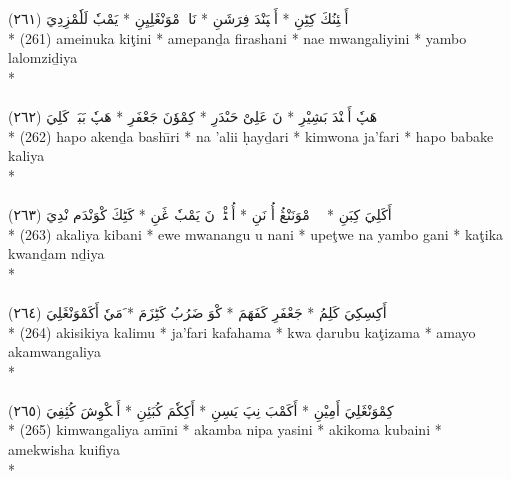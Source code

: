 \documentclass[a4paper, 12pt]{report}
\begin{document}
\begin{center}
\textarabic{(٢٦١) \textcolor{mygreen}{أَمٖئِنُكَ كِٹِنِ  * أَمٖپَنْدَ فِرَشَنِ  * نَاءٖ مْوَنْڠَلِيِنِ  * يَمْبٗ لَلٗمْزِدِيَ }} \\* 
(261) ameinuka kiţini  * amepanḏa firashani  * nae mwangaliyini  * yambo lalomziḏiya  \\* 
 \\ 
\\[8mm] 

\textarabic{(٢٦٢) \textcolor{mygreen}{هَپٗ أَكٖنْدَ بَشِيْرِ  * نَ عَلِىْ حَىْدَرِ  * كِمْوٗنَ جَعْفَرِ  * هَپٗ بَبَكٖ كَلِيَ }} \\* 
(262) hapo akenḏa bashı̄ri  * na 'alii ḥayḏari  * kimwona ja'fari  * hapo babake kaliya  \\* 
 \\ 
\\[8mm] 

\textarabic{(٢٦٣) \textcolor{mygreen}{أَكَلِيَ كِبَنِ  * إٖوٖ مْوَنَنْڠُ أُ نَنِ  * أُپٖٹْوٖ نَ يَمْبٗ ڠَنِ  * كَٹِكَ كْوَنْدَم نْدِيَ }} \\* 
(263) akaliya kibani  * ewe mwanangu u nani  * upeţwe na yambo gani  * kaţika kwanḏam nḏiya  \\* 
 \\ 
\\[8mm] 

\textarabic{(٢٦٤) \textcolor{mygreen}{أَكِسِكِيَ كَلِمُ  * جَعْفَرِ كَفَهَمَ  * كْوَ ضَرُبُ كَٹِزَمَ  * َمَيٗ أَكَمْوَنْڠَلِيَ }} \\* 
(264) akisikiya kalimu  * ja'fari kafahama  * kwa ḍarubu kaţizama  * amayo akamwangaliya  \\* 
 \\ 
\\[8mm] 

\textarabic{(٢٦٥) \textcolor{mygreen}{كِمْوَنْڠَلِيَ أَمِيْنِ  * أَكَمْبَ نِپَ يَسِنِ  * أَكِكٗمَ كُبَئِنِ  * أَمٖكْوِشَ كُئِفِيَ }} \\* 
(265) kimwangaliya amı̄ni  * akamba nipa yasini  * akikoma kubaini  * amekwisha kuifiya  \\* 
 \\ 
\\[8mm] 


\end{center}
\end{document}
